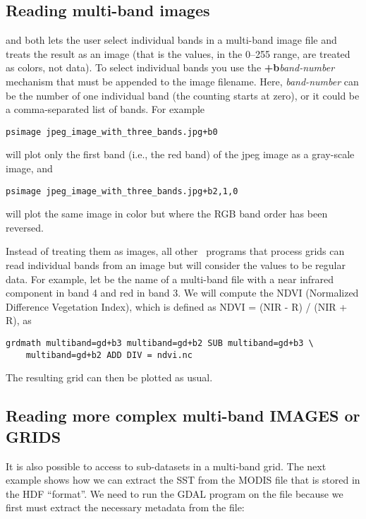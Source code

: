 \subsection{Reading multi-band images}

 and  both lets the user select individual bands
in a multi-band image file and treats the result as an image (that is the values,
in the 0--255 range, are treated as colors, not data). To select individual bands
you use the \textbf{+b}{\it band-number} mechanism that must be appended to the image
filename. Here, {\it band-number} can be the number of one individual band (the
counting starts at zero), or it could be a comma-separated list of bands. For example
\begin{verbatim}
psimage jpeg_image_with_three_bands.jpg+b0
\end{verbatim}
will plot only the first band (i.e., the red band) of the jpeg image as a gray-scale image, and
\begin{verbatim}
psimage jpeg_image_with_three_bands.jpg+b2,1,0
\end{verbatim}
will plot the same image in color but where the RGB band order has been reversed.

Instead of treating them as images, all other \GMT\ programs that process grids can
read individual bands from an image but will consider the values to be regular data.
For example, let  be the name of a multi-band file with a near
infrared component in band 4 and red in band 3. We will compute the NDVI (Normalized
Difference Vegetation Index), which is defined as NDVI = (NIR - R) / (NIR + R), as
\begin{verbatim}
grdmath multiband=gd+b3 multiband=gd+b2 SUB multiband=gd+b3 \
	multiband=gd+b2 ADD DIV = ndvi.nc
\end{verbatim}
The resulting grid  can then be plotted as usual.

\subsection{Reading more complex multi-band IMAGES or GRIDS}

It is also possible to access to sub-datasets in a multi-band grid. The next example
shows how we can extract the SST from the MODIS file 
that is stored in the HDF ``format''. We need to run the GDAL program \GMTprog{gdalinfo} on the
file because we first must extract the necessary metadata from the file:

